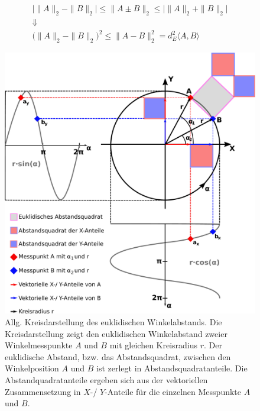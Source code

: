 %


\begin{equation}\label{eq:v2ndreiecksungleichung}
	\begin{gathered}
	\big|\|A\|_2 - \|B\|_2\big| \le \|A \pm B\|_2 \le \big|\|A\|_2 + \|B\|_2\big| \\
	\Downarrow \\
	\big(\|A\|_2 - \|B\|_2\big)^2 \le \|A - B\|_2^2 = d_E^2\langle A,B \rangle
	\end{gathered}
\end{equation}


\begin{figure}[tbph]
	\centering
	\includegraphics[width=0.7\linewidth]{chapters/images/Kreisdarstellung_Winkelabstand}
	\caption[Allg. Kreisdarstellung des euklidischen Winkelabstands]{Allg. Kreisdarstellung des euklidischen 
	Winkelabstands. Die Kreisdarstellung zeigt den euklidischen Winkelabstand zweier Winkelmesspunkte $A$ und $B$ 
	mit gleichen Kreisradius $r$. Der euklidische Abstand, bzw. das Abstandsquadrat, zwischen den Winkelposition 
	$A$ und	$B$ ist zerlegt in Abstandsquadratanteile. Die Abstandquadratanteile ergeben sich aus der vektoriellen 
	Zusammensetzung in $X$-/ $Y$-Anteile für die einzelnen Messpunkte $A$ und $B$.}
	\label{fig:kreisdarstellungwinkelabstand}
\end{figure}


